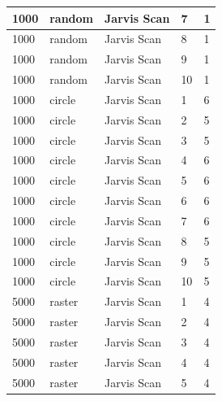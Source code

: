 \documentclass[12pt]{article}
\begin{document}
\begin{longtable}{|l|l|l|l|l|}
1000         & random            & Jarvis Scan & 7          & 1                             \\ \hline
1000         & random            & Jarvis Scan & 8          & 1                             \\ \hline
1000         & random            & Jarvis Scan & 9          & 1                             \\ \hline
1000         & random            & Jarvis Scan & 10         & 1                             \\ \hline
1000         & circle            & Jarvis Scan & 1          & 6                             \\ \hline
1000         & circle            & Jarvis Scan & 2          & 5                             \\ \hline
1000         & circle            & Jarvis Scan & 3          & 5                             \\ \hline
1000         & circle            & Jarvis Scan & 4          & 6                             \\ \hline
1000         & circle            & Jarvis Scan & 5          & 6                             \\ \hline
1000         & circle            & Jarvis Scan & 6          & 6                             \\ \hline
1000         & circle            & Jarvis Scan & 7          & 6                             \\ \hline
1000         & circle            & Jarvis Scan & 8          & 5                             \\ \hline
1000         & circle            & Jarvis Scan & 9          & 5                             \\ \hline
1000         & circle            & Jarvis Scan & 10         & 5                             \\ \hline
5000         & raster            & Jarvis Scan & 1          & 4                             \\ \hline
5000         & raster            & Jarvis Scan & 2          & 4                             \\ \hline
5000         & raster            & Jarvis Scan & 3          & 4                             \\ \hline
5000         & raster            & Jarvis Scan & 4          & 4                             \\ \hline
5000         & raster            & Jarvis Scan & 5          & 4                             \\ \hline

\end{longtable}
\end{document}
